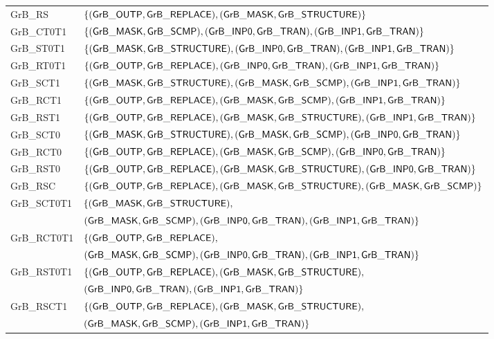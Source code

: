 \begin{table}[htbp]
\begin{center}
\begin{small}
\begin{tabular}{l|l}
		{\sf GrB\_RS}		& $\{ ({\sf GrB\_OUTP},{\sf GrB\_REPLACE})  , ({\sf GrB\_MASK},{\sf GrB\_STRUCTURE})                      \}$	\\
		{\sf GrB\_CT0T1}	& $\{ ({\sf GrB\_MASK},{\sf GrB\_SCMP})     ,({\sf GrB\_INP0},{\sf GrB\_TRAN}),({\sf GrB\_INP1},{\sf GrB\_TRAN})    \}$	\\
		{\sf GrB\_ST0T1}	& $\{ ({\sf GrB\_MASK},{\sf GrB\_STRUCTURE}),({\sf GrB\_INP0},{\sf GrB\_TRAN}),({\sf GrB\_INP1},{\sf GrB\_TRAN})    \}$       \\
		{\sf GrB\_RT0T1}	& $\{ ({\sf GrB\_OUTP},{\sf GrB\_REPLACE})  ,({\sf GrB\_INP0},{\sf GrB\_TRAN}),({\sf GrB\_INP1},{\sf GrB\_TRAN})    \}$    	\\
		{\sf GrB\_SCT1}		& $\{ ({\sf GrB\_MASK},{\sf GrB\_STRUCTURE}),({\sf GrB\_MASK},{\sf GrB\_SCMP}),({\sf GrB\_INP1},{\sf GrB\_TRAN})      \}$	\\
		{\sf GrB\_RCT1}		& $\{ ({\sf GrB\_OUTP},{\sf GrB\_REPLACE})  ,({\sf GrB\_MASK},{\sf GrB\_SCMP}),({\sf GrB\_INP1},{\sf GrB\_TRAN})      \}$	\\
		{\sf GrB\_RST1}		& $\{ ({\sf GrB\_OUTP},{\sf GrB\_REPLACE})  ,({\sf GrB\_MASK},{\sf GrB\_STRUCTURE}),({\sf GrB\_INP1},{\sf GrB\_TRAN}) \}$	\\
		{\sf GrB\_SCT0}		& $\{ ({\sf GrB\_MASK},{\sf GrB\_STRUCTURE}),({\sf GrB\_MASK},{\sf GrB\_SCMP}),({\sf GrB\_INP0},{\sf GrB\_TRAN})      \}$	\\
		{\sf GrB\_RCT0}		& $\{ ({\sf GrB\_OUTP},{\sf GrB\_REPLACE})  ,({\sf GrB\_MASK},{\sf GrB\_SCMP}),({\sf GrB\_INP0},{\sf GrB\_TRAN})      \}$	\\
		{\sf GrB\_RST0}		& $\{ ({\sf GrB\_OUTP},{\sf GrB\_REPLACE})  ,({\sf GrB\_MASK},{\sf GrB\_STRUCTURE}),({\sf GrB\_INP0},{\sf GrB\_TRAN}) \}$	\\
		{\sf GrB\_RSC}		& $\{ ({\sf GrB\_OUTP},{\sf GrB\_REPLACE})  , ({\sf GrB\_MASK},{\sf GrB\_STRUCTURE}), ({\sf GrB\_MASK},{\sf GrB\_SCMP}) \}$	\\
		{\sf GrB\_SCT0T1}	& $\{ ({\sf GrB\_MASK},{\sf GrB\_STRUCTURE}),                                                 $ 	\\
					& $   ({\sf GrB\_MASK},{\sf GrB\_SCMP})     , ({\sf GrB\_INP0},{\sf GrB\_TRAN}), ({\sf GrB\_INP1},{\sf GrB\_TRAN})  \}$ 	\\
		{\sf GrB\_RCT0T1}	& $\{ ({\sf GrB\_OUTP},{\sf GrB\_REPLACE})  ,                                                 $ 	\\
					& $   ({\sf GrB\_MASK},{\sf GrB\_SCMP})     , ({\sf GrB\_INP0},{\sf GrB\_TRAN}), ({\sf GrB\_INP1},{\sf GrB\_TRAN})  \}$ 	\\
		{\sf GrB\_RST0T1}	& $\{ ({\sf GrB\_OUTP},{\sf GrB\_REPLACE})  , ({\sf GrB\_MASK},{\sf GrB\_STRUCTURE}),                       $ 	\\
					& $   ({\sf GrB\_INP0},{\sf GrB\_TRAN})   , ({\sf GrB\_INP1},{\sf GrB\_TRAN})                         \}$	\\
		{\sf GrB\_RSCT1}	& $\{ ({\sf GrB\_OUTP},{\sf GrB\_REPLACE})  , ({\sf GrB\_MASK},{\sf GrB\_STRUCTURE}),                       $	\\
					& $   ({\sf GrB\_MASK},{\sf GrB\_SCMP})     , ({\sf GrB\_INP1},{\sf GrB\_TRAN})                         \}$	\\

\end{tabular}
\end{small}
\end{center}
\end{table}
